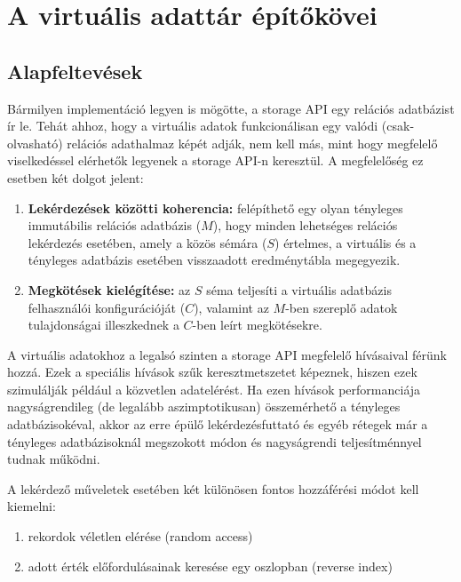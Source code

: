 \documentclass[
    parspace,
    noindent,
    nohyp,
]{elteiktdk}[2023/04/10]
\begin{document}
\chapter{A virtuális adattár építőkövei}

\section{Alapfeltevések}

Bármilyen implementáció legyen is mögötte, a storage API egy relációs adatbázist ír le.
Tehát ahhoz, hogy a virtuális adatok funkcionálisan egy valódi (csak-olvasható) relációs adathalmaz képét adják,
nem kell más, mint hogy megfelelő viselkedéssel elérhetők legyenek a storage API-n keresztül.
A megfelelőség ez esetben két dolgot jelent:

\begin{enumerate}
  \item \textbf{Lekérdezések közötti koherencia:}
        felépíthető egy olyan tényleges immutábilis relációs adatbázis ($M$),
        hogy minden lehetséges relációs lekérdezés esetében, amely a közös sémára ($S$) értelmes,
        a virtuális és a tényleges adatbázis esetében visszaadott eredménytábla megegyezik.
  \item \textbf{Megkötések kielégítése:}
        az $S$ séma teljesíti a virtuális adatbázis felhasználói konfigurációját ($C$),
        valamint az $M$-ben szereplő adatok tulajdonságai illeszkednek a $C$-ben leírt megkötésekre.
\end{enumerate}

A virtuális adatokhoz a legalsó szinten a storage API megfelelő hívásaival férünk hozzá.
Ezek a speciális hívások szűk keresztmetszetet képeznek,
hiszen ezek szimulálják például a közvetlen adatelérést.
Ha ezen hívások performanciája nagyságrendileg (de legalább aszimptotikusan) összemérhető a tényleges adatbázisokéval,
akkor az erre épülő lekérdezésfuttató és egyéb rétegek már
a tényleges adatbázisoknál megszokott módon és nagyságrendi teljesítménnyel tudnak működni.

A lekérdező műveletek esetében két különösen fontos hozzáférési módot kell kiemelni:

\begin{enumerate}
  \item rekordok véletlen elérése (random access)
  \item adott érték előfordulásainak keresése egy oszlopban (reverse index)
\end{enumerate}
\end{document}
